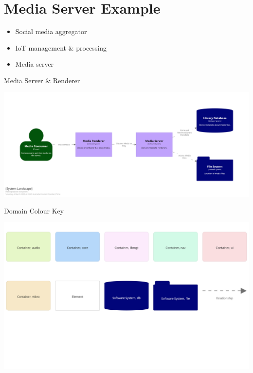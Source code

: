 \documentclass{slide}
\begin{document}
\section{Media Server Example}

{
\begin{itemize}
    \item Social media aggregator
    \item IoT management \& processing
    \item Media server
\end{itemize}
}

\begin{frame}{Media Server \& Renderer}
    \begin{adjustwidth}{-7.5mm}{-7.5mm}
        \includegraphics[trim=195 197 195 195,clip,width=0.97\paperwidth]{diagrams/overall_context.png}
    \end{adjustwidth}
\end{frame}

\begin{frame}{Domain Colour Key}
    \begin{adjustwidth}{-7.5mm}{-7.5mm}
        \includegraphics[trim=20 599 22 96,clip,width=0.97\paperwidth]{diagrams/key.png}
    \end{adjustwidth}
\end{frame}
\end{document}
